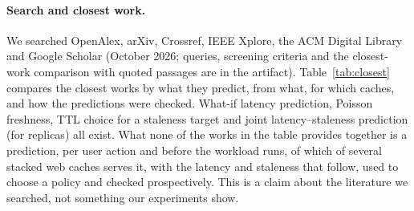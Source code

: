 \documentclass[acmsmall,review,nonacm]{acmart}
\begin{document}
\paragraph{Search and closest work.}
We searched OpenAlex, arXiv, Crossref, IEEE Xplore, the ACM Digital Library and Google Scholar (October 2026; queries, screening criteria and the closest-work comparison with quoted passages are in the artifact). Table~\ref{tab:closest} compares the closest works by what they predict, from what, for which caches, and how the predictions were checked. What-if latency prediction, Poisson freshness, TTL choice for a staleness target and joint latency--staleness prediction (for replicas) all exist. What none of the works in the table provides together is a prediction, per user action and before the workload runs, of which of several stacked web caches serves it, with the latency and staleness that follow, used to choose a policy and checked prospectively. This is a claim about the literature we searched, not something our experiments show.
\end{document}
